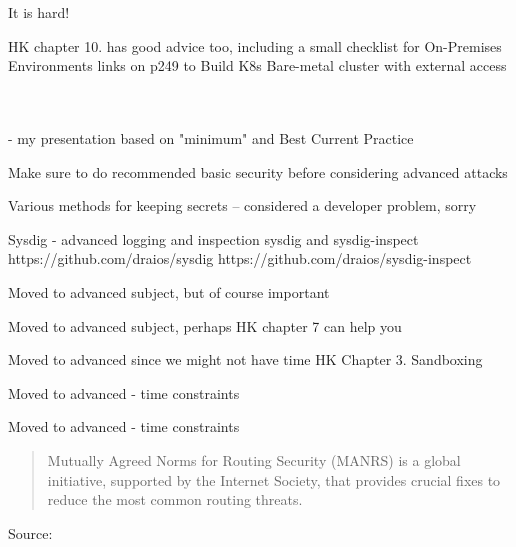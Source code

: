\documentclass[Screen16to9,17pt]{foils}
\begin{document}


\begin{list2}
\item It is hard!


\item HK chapter 10. has good advice too, including a small checklist for On-Premises Environments
links on p249 to Build K8s Bare-metal cluster with external access\\
\\
\\
\end{list2}


\myquestionspage


- my presentation based on "minimum" and Best Current Practice

Make sure to do recommended basic security before considering advanced attacks

Various methods for keeping secrets -- considered a developer problem, sorry


Sysdig - advanced logging and inspection
sysdig and sysdig-inspect
https://github.com/draios/sysdig
https://github.com/draios/sysdig-inspect


Moved to advanced subject, but of course important


Moved to advanced subject, perhaps HK chapter 7 can help you


Moved to advanced since we might not have time
HK Chapter 3. Sandboxing

Moved to advanced - time constraints

Moved to advanced - time constraints



\begin{quote}
  Mutually Agreed Norms for Routing Security (MANRS) is a global initiative, supported by the Internet Society, that provides crucial fixes to reduce the most common routing threats. ﻿
\end{quote}
Source: {\small{}}
\end{document}
